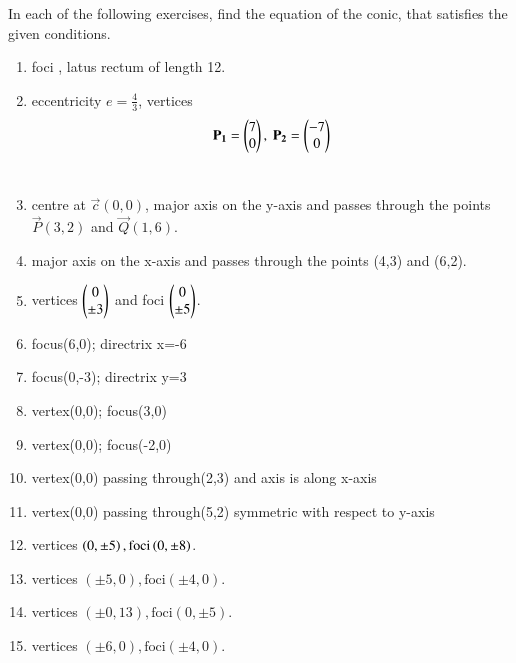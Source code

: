 In each of the following exercises, find the equation of the conic, that satisfies the given conditions.

\begin{enumerate}[label=\thesubsection.\arabic*,ref=\thesubsection.\theenumi,resume*]
\item  foci , latus rectum of length 12.
\\
\solution
		
    \item eccentricity $e = \frac{4}{3}$,
    vertices 
    \begin{align}
        \mathbf{P_1} = \begin{pmatrix}7\\0\end{pmatrix},\ \mathbf{P_2} = \begin{pmatrix}-7\\0\end{pmatrix}
        \label{eq:chapters/11/11/4/14/vert}
    \end{align}
\\
\solution
		
\item centre at $\vec{c}(0,0)$, major axis on the y-axis and passes through the points $\vec{P}(3,2)$ and $\vec{Q}(1,6)$.
\\
\solution

\item major axis on the x-axis and passes through the points (4,3) and (6,2).
\\
\solution
\item vertices $\begin{pmatrix}0\\\pm 3\end{pmatrix}$ and foci $\begin{pmatrix}0\\\pm5\end{pmatrix}$.
	\\
\solution
\item focus(6,0); directrix x=-6 
\item focus(0,-3); directrix y=3
\item vertex(0,0); focus(3,0)
\item vertex(0,0); focus(-2,0) 
\item vertex(0,0) passing through(2,3) and axis is along x-axis
\item vertex(0,0) passing through(5,2) symmetric with respect to y-axis
\item vertices $\left(0,\pm 5\right), \text{foci} \left(0,\pm 8\right)$.  
\item vertices $(\pm5,0),\text{foci} (\pm4,0)$.
\item vertices $(\pm0,13),\text{foci} (0,\pm5)$.
\item vertices $(\pm6,0),\text{foci} (\pm4,0)$.

\end{enumerate}
